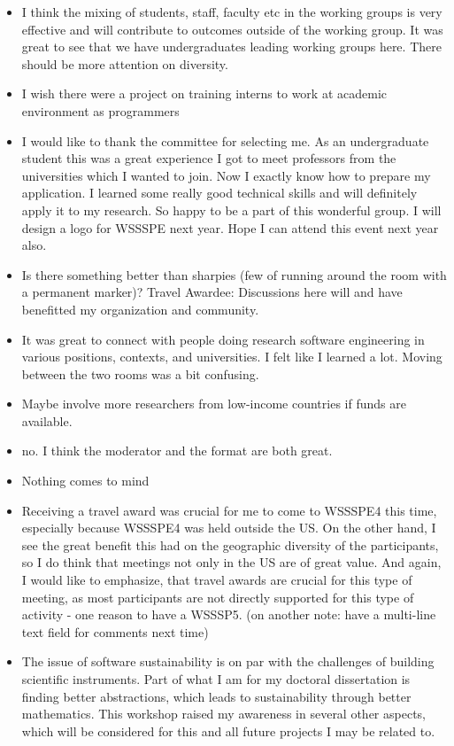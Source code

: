 \begin{enumerate}
\begin{itemize}
\item I think the mixing of students, staff, faculty etc in the working groups is very effective and will contribute to  outcomes outside of the working group. It was great to see that we have undergraduates leading working groups here. There should be more attention on diversity.
\item I wish there were a project on training interns to work at academic environment as programmers
\item I would like to thank the committee for selecting me. As an undergraduate student this was a great experience I got to meet professors from the universities which I wanted to join. Now I exactly know how to prepare my application. I learned some really good technical skills and will definitely apply it to my research. So happy to be a part of this wonderful group. I will design a  logo for WSSSPE next year. Hope I can attend this event next year also.
\item Is there something better than sharpies (few of running around the room with a permanent marker)? Travel Awardee: Discussions here will and have benefitted my organization and community.
\item It was great to connect with people doing research software engineering in various positions, contexts, and universities. I felt like I learned a lot. Moving between the two rooms was a bit confusing.
\item Maybe involve more researchers from low-income countries if funds are available.
\item no. I think the moderator and the format are both great.
\item Nothing comes to mind
\item Receiving a travel award was crucial for me to come to WSSSPE4 this time, especially because WSSSPE4 was held outside the US. On the other hand, I see the great benefit this had on the geographic diversity of the participants, so I do think that meetings not only in the US are of great value. And again, I would like to emphasize, that travel awards are crucial for this type of meeting, as most participants are not directly supported for this type of activity - one reason to have a WSSSP5. (on another note: have a multi-line text field for comments next time)
\item The issue of software sustainability is on par with the challenges of building scientific instruments. Part of what I am for my doctoral dissertation is finding better abstractions, which leads to sustainability through better mathematics. This workshop raised my awareness in several other aspects, which will be considered for this and all future projects I may be related to.

\end{itemize}
\end{enumerate}

